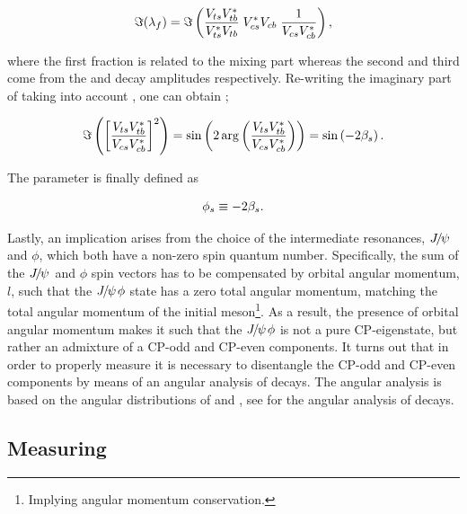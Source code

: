 \begin{equation}
  \centering
 \Im(\lambda_f) = \Im\parenthesis{ \frac{\Vts\Vtb^*}{\Vts^*\Vtb} \; \Vcs^*\Vcb \; \frac{1}{\Vcs\Vcb^*} },
 \label{lambdaf_ckm}
\end{equation}

\noindent where the first fraction is related to the mixing part \qoverp whereas the second and third come from the \Bsb and \Bs
decay amplitudes respectively. Re-writing the imaginary part of  taking into account ,
one can obtain ;

\begin{equation}
  \centering
  \Im\parenthesis{ \brackets{ \frac{\Vts\Vtb^*}{\Vcs\Vcb^*}}^2 } =
  \sin \parenthesis{2 \arg \parenthesis{\frac{\Vts\Vtb^*}{\Vcs\Vcb^*}}} =
  \sin \parenthesis{-2\betas}.
 \label{lambda_ckm_manip}
\end{equation}

\noindent The parameter \phis is finally defined as

\begin{equation}
  \centering
  \phis\equiv-2\betas.
 \label{phis_def}
\end{equation}

\noindent Lastly, an implication arises from the choice of the intermediate resonances, ${J\mskip -3mu/\mskip -2mu\psi\mskip 2mu}$ and $\phi$,
which both have a non-zero spin quantum number. Specifically, the sum of the ${J\mskip -3mu/\mskip -2mu\psi\mskip 2mu}$ and $\phi$ spin vectors
has to be compensated by orbital angular momentum, $l$, such that the ${J\mskip -3mu/\mskip -2mu\psi\mskip 2mu}\phi$ state has a zero total
angular momentum, matching the total angular momentum of the initial \Bs meson\footnote{Implying angular momentum conservation.}.
As a result, the presence of orbital angular momentum makes it such that the ${J\mskip -3mu/\mskip -2mu\psi\mskip 2mu}\phi$ is not a pure CP-eigenstate,
but rather an admixture of a CP-odd and CP-even components.
It turns out that in order to properly measure \phis it is necessary to disentangle the CP-odd and CP-even
components by means of an angular analysis of \BsJpsiPhi decays. The angular analysis is based on the
angular distributions of \phiKK and \Jpsimumu, see  for the angular analysis
of \BsJpsiKst decays.

\subsection{Measuring \phis}
\label{measuring_phis}

